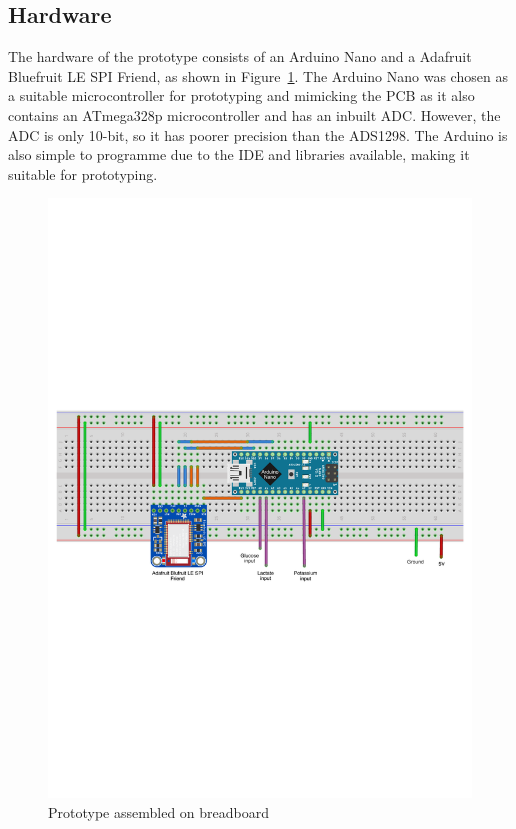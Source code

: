 \subsection{Hardware}
The hardware of the prototype consists of an Arduino Nano and a Adafruit Bluefruit LE SPI Friend, as shown in Figure~\ref{fig: breadboard}. The Arduino Nano was chosen as a suitable microcontroller for prototyping and mimicking the PCB as it also contains an ATmega328p microcontroller and has an inbuilt ADC. However, the ADC is only 10-bit, so it has poorer precision than the ADS1298. The Arduino is also simple to programme due to the IDE and libraries available, making it suitable for prototyping.

\begin{figure}[H]
\centering
\includegraphics[trim={0cm 10.5cm 0cm  10cm}, clip, width=1\textwidth]{./figures/Breadboard2.pdf}
\captionsetup{justification=centering}
\caption{Prototype assembled on breadboard}
\label{fig: breadboard}
\end{figure}

